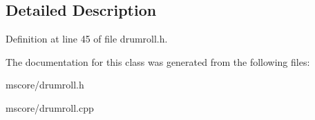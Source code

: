\subsection{Detailed Description}


Definition at line 45 of file drumroll.\+h.



The documentation for this class was generated from the following files\+:\begin{DoxyCompactItemize}
\item 
mscore/drumroll.\+h\item 
mscore/drumroll.\+cpp\end{DoxyCompactItemize}
